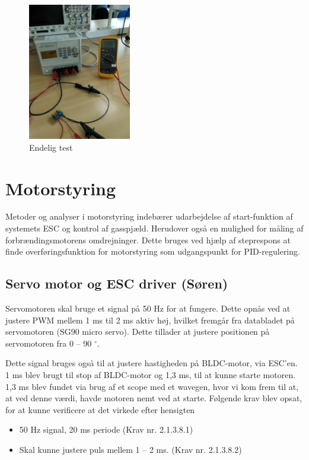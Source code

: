 \begin{figure}[h]
  \centering
  \includegraphics[width=0.4\textwidth]{./figurer/j12.png}
  \caption{Endelig test}
  \label{fig:j12}
\end{figure}

\clearpage
\section{Motorstyring}
\label{sec:motorstyring-1}

Metoder og analyser i motorstyring indebærer udarbejdelse af start-funktion af systemets ESC og kontrol af gasspjæld. Herudover også en mulighed for måling af forbrændingsmotorens omdrejninger. Dette bruges ved hjælp af steprespons at finde overføringsfunktion for motorstyring som udgangspunkt for PID-regulering.

\subsection{Servo motor og ESC driver (Søren)}
\label{sec:servo-motor-og}

Servomotoren skal bruge et signal på 50 Hz for at fungere. Dette opnås ved at justere PWM mellem 1 ms til 2 ms aktiv høj, hvilket fremgår fra databladet på servomotoren (SG90 micro servo). Dette tillader at justere positionen på servomotoren fra 0 – 90 $^\circ$.

Dette signal bruges også til at justere hastigheden på BLDC-motor, via ESC'en. 1 ms blev brugt til stop af BLDC-motor og 1,3 ms, til at kunne starte motoren. 1,3 ms blev fundet via brug af et scope med et wavegen, hvor vi kom frem til at, at ved denne værdi, havde motoren nemt ved at starte. Følgende krav blev opsat, for at kunne verificere at det virkede efter hensigten

\begin{itemize}
\item 50 Hz signal, 20 ms periode (Krav nr. 2.1.3.8.1)
\item Skal kunne justere puls mellem 1 – 2 ms. (Krav nr. 2.1.3.8.2)
\end{itemize}

